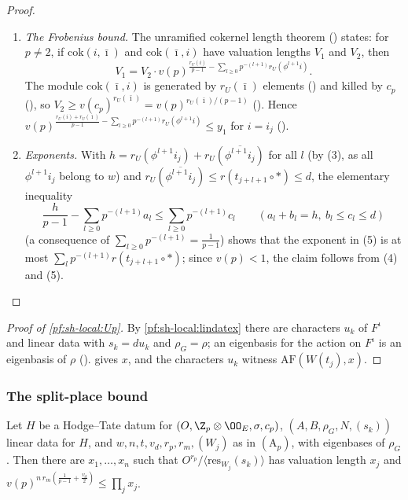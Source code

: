 \begin{proof}
\begin{enumerate}[label=(\arabic*)]
$O^{r(t_j)}/\langle\mathrm{res}_{W(t_j)}(s_k)\rangle$ (); so
$y_1\le x$ by (2), where $x$ is the valuation length of the latter module.
\item \emph{The Frobenius bound.} The unramified cokernel length theorem
() states: for $p\ne2$, if $\mathrm{cok}(i,\bar\imath)$ and $\mathrm{cok}(\bar\imath,i)$
have valuation lengths $V_1$ and $V_2$, then
\[
V_1=V_2\cdot v(p)^{\frac{r_U(i)}{p-1}-\sum_{l\ge0}p^{-(l+1)}r_U(\phi^{l+1}i)} .
\]
The module $\mathrm{cok}(\bar\imath,i)$ is generated by $r_U(\bar\imath)$ elements
() and killed by $c_p$ (),
so $V_2\ge v(c_p)^{r_U(\bar\imath)}=v(p)^{r_U(\bar\imath)/(p-1)}$
(). Hence
$v(p)^{\frac{r_U(i)+r_U(\bar\imath)}{p-1}-\sum_{l\ge0}p^{-(l+1)}r_U(\phi^{l+1}i)}\le y_1$ for $i=i_j$
().
\item \emph{Exponents.} With $h=r_U(\phi^{l+1}i_j)+r_U(\overline{\phi^{l+1}i_j})$ for all $l$ (by (3), as all
$\phi^{l+1}i_j$ belong to $w$) and $r_U(\overline{\phi^{l+1}i_j})\le r(t_{j+l+1}\circ*)\le d$, the elementary
inequality 
\[
\frac h{p-1}-\sum_{l\ge0}p^{-(l+1)}a_l\le\sum_{l\ge0}p^{-(l+1)}c_l\qquad(a_l+b_l=h,\ b_l\le c_l\le d)
\]
(a consequence of $\sum_{l\ge0}p^{-(l+1)}=\frac1{p-1}$) shows that the exponent in (5) is at most
$\sum_lp^{-(l+1)}r(t_{j+l+1}\circ*)$; since $v(p)<1$, the claim follows from (4) and (5).
\end{enumerate}
\end{proof}

\begin{proof}[Proof of \cref{pf:sh-local:Up}]
By \cref{pf:sh-local:lindatex} there are characters $u_k$ of $F^\iota$ and linear data with $s_k=du_k$ and
$\rho_G=\rho$; an eigenbasis for the action on $F^\iota$ is an eigenbasis of $\rho$
().  gives $x$, and the characters $u_k$ witness
$\mathrm{AF}(W(t_j),x)$.
\end{proof}

\subsubsection{The split-place bound}

\begin{proposition}\label{pf:sh-local:lindatA}
Let $H$ be a Hodge--Tate datum for $(O,\Z_p\otimes\OO_E,\sigma,c_p)$, $(A,B,\rho_G,N,(s_k))$ linear data for $H$, and
$w,n,t,v_d,r_p,r_m,(W_j)$ as in $(\mathrm A_p)$, with eigenbases of $\rho_G$. Then there are $x_1,\dots,x_n$ such that
$O^{r_p}/\langle\mathrm{res}_{W_j}(s_k)\rangle$ has valuation length $x_j$ and
$v(p)^{n\,r_m(\frac1{p-1}+\frac{v_d}2)}\le\prod_jx_j$.
\end{proposition}

